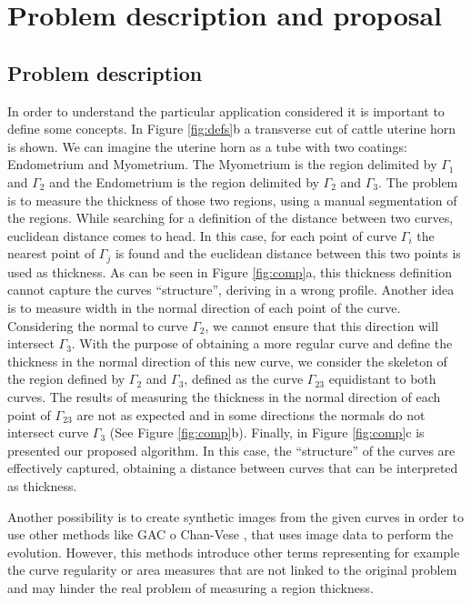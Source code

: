\documentclass{article}
\begin{document}
\section{Problem description and proposal}
\label{sec:proposal}

\subsection{Problem description}
\label{ssec:description}
In order to understand the particular application considered it is important to define some concepts. In Figure \ref{fig:defs}b a transverse cut of cattle uterine horn is shown. We can imagine the uterine horn as a tube with two coatings: Endometrium and Myometrium. The Myometrium is the region delimited by $\Gamma_1$ and $\Gamma_2$ and the Endometrium is the region delimited by $\Gamma_2$ and $\Gamma_3$. The problem is to measure the thickness of those two regions, using a manual segmentation of the regions.
While searching for a definition of the distance between two curves, euclidean distance comes to head. In this case, for each point of curve $\Gamma_i$ the nearest point of $\Gamma_j$ is found and the euclidean distance between this two points is used as thickness. As can be seen in Figure \ref{fig:comp}a, this thickness definition cannot capture the curves ``structure'', deriving in a wrong profile. Another idea is to measure width in the normal direction of each point of the curve. Considering the normal to curve $\Gamma_2$, we cannot ensure that this direction will intersect $\Gamma_3$. With the purpose of obtaining a more regular curve and define the thickness in the normal direction of this new curve, we consider the skeleton of the region defined by $\Gamma_2$ and $\Gamma_3$, defined as the curve $\Gamma_{23}$ equidistant to both curves. The results of measuring the thickness in the normal direction of each point of $\Gamma_{23}$ are not as expected and in some directions the normals do not intersect curve $\Gamma_3$ (See Figure \ref{fig:comp}b). Finally, in Figure \ref{fig:comp}c is presented our proposed algorithm. In this case, the ``structure'' of the curves are effectively captured, obtaining a distance between curves that can be interpreted as thickness.

Another possibility is to create synthetic images from the given curves in order to use other methods like GAC \cite{gac} o Chan-Vese \cite{chan-vese}, that uses image data to perform the evolution. However, this methods introduce other terms representing for example the curve regularity or area measures that are not linked to the original problem and may hinder the real problem of measuring a region thickness. 
\end{document}
